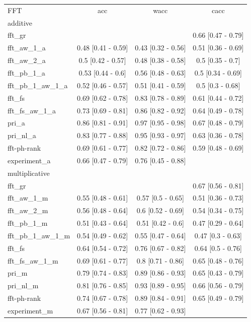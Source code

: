 \begin{tabular}{lccc}
FFT & acc & wacc & cacc \\
additive \\
fft\_gr &  &  & 0.66 [0.47 - 0.79] \\
fft\_aw\_1\_a & 0.48 [0.41 - 0.59] & 0.43 [0.32 - 0.56] & 0.51 [0.36 - 0.69] \\
fft\_aw\_2\_a & 0.5 [0.42 - 0.57] & 0.48 [0.38 - 0.58] & 0.5 [0.35 - 0.7] \\
fft\_pb\_1\_a & 0.53 [0.44 - 0.6] & 0.56 [0.48 - 0.63] & 0.5 [0.34 - 0.69] \\
fft\_pb\_1\_aw\_1\_a & 0.52 [0.46 - 0.57] & 0.51 [0.41 - 0.59] & 0.5 [0.3 - 0.68] \\
fft\_fs & 0.69 [0.62 - 0.78] & 0.83 [0.78 - 0.89] & 0.61 [0.44 - 0.72] \\
fft\_fs\_aw\_1\_a & 0.73 [0.69 - 0.81] & 0.86 [0.82 - 0.92] & 0.64 [0.49 - 0.78] \\
pri\_a & 0.86 [0.81 - 0.91] & 0.97 [0.95 - 0.98] & 0.67 [0.48 - 0.79] \\
pri\_nl\_a & 0.83 [0.77 - 0.88] & 0.95 [0.93 - 0.97] & 0.63 [0.36 - 0.78] \\
fft-ph-rank & 0.69 [0.61 - 0.77] & 0.82 [0.72 - 0.86] & 0.59 [0.48 - 0.69] \\
experiment\_a & 0.66 [0.47 - 0.79] & 0.76 [0.45 - 0.88] &  \\
multiplicative \\
fft\_gr &  &  & 0.67 [0.56 - 0.81] \\
fft\_aw\_1\_m & 0.55 [0.48 - 0.61] & 0.57 [0.5 - 0.65] & 0.51 [0.36 - 0.73] \\
fft\_aw\_2\_m & 0.56 [0.48 - 0.64] & 0.6 [0.52 - 0.69] & 0.54 [0.34 - 0.75] \\
fft\_pb\_1\_m & 0.51 [0.43 - 0.64] & 0.51 [0.42 - 0.6] & 0.47 [0.29 - 0.64] \\
fft\_pb\_1\_aw\_1\_m & 0.54 [0.49 - 0.62] & 0.55 [0.47 - 0.64] & 0.47 [0.3 - 0.63] \\
fft\_fs & 0.64 [0.54 - 0.72] & 0.76 [0.67 - 0.82] & 0.64 [0.5 - 0.76] \\
fft\_fs\_aw\_1\_m & 0.69 [0.61 - 0.77] & 0.8 [0.71 - 0.86] & 0.65 [0.48 - 0.76] \\
pri\_m & 0.79 [0.74 - 0.83] & 0.89 [0.86 - 0.93] & 0.65 [0.43 - 0.79] \\
pri\_nl\_m & 0.81 [0.76 - 0.85] & 0.93 [0.89 - 0.95] & 0.66 [0.56 - 0.79] \\
fft-ph-rank & 0.74 [0.67 - 0.78] & 0.89 [0.84 - 0.91] & 0.65 [0.49 - 0.79] \\
experiment\_m & 0.67 [0.56 - 0.81] & 0.77 [0.62 - 0.93] &  \\
\end{tabular}
